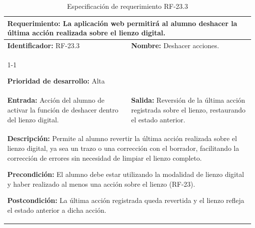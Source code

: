 \begin{longtable}{|p{7cm}|p{8cm}|}
\caption{Especificación de requerimiento RF-23.3}
\label{tab:rf23_3} \\ \hline

\multicolumn{2}{|p{15cm}|}{\textbf{Requerimiento:} La aplicación web permitirá al alumno deshacer la última acción realizada sobre el lienzo digital.} \\ \hline

\textbf{Identificador:} RF-23.3 &
\textbf{Nombre:} Deshacer acciones. \\ \cline{1-1}

\textbf{Prioridad de desarrollo:} Alta &
\multicolumn{1}{p{8cm}|}{} \\ \hline

\textbf{Entrada:} Acción del alumno de activar la función de deshacer dentro del lienzo digital. &
\textbf{Salida:} Reversión de la última acción registrada sobre el lienzo, restaurando el estado anterior. \\ \hline

\multicolumn{2}{|p{15cm}|}{
\textbf{Descripción:} Permite al alumno revertir la última acción realizada sobre el lienzo digital, ya sea un trazo o una corrección con el borrador, facilitando la corrección de errores sin necesidad de limpiar el lienzo completo.

\vspace{0.2cm}
\textbf{Precondición:} El alumno debe estar utilizando la modalidad de lienzo digital y haber realizado al menos una acción sobre el lienzo (RF-23).

\vspace{0.2cm}
\textbf{Postcondición:} La última acción registrada queda revertida y el lienzo refleja el estado anterior a dicha acción.
} \\ \hline

\end{longtable}

